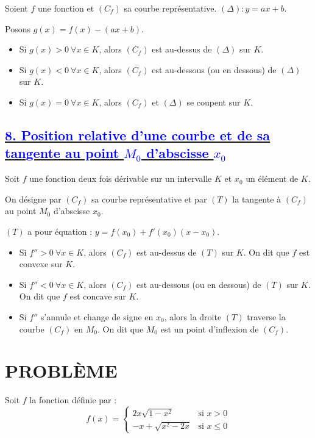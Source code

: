 \documentclass{article}
\begin{document}
Soient $f$ une fonction et $(C_f)$ sa courbe représentative. $(\Delta) : y = ax + b$.

Posons $g(x) = f(x) - (ax + b)$.

\begin{itemize}
    \item Si $g(x) > 0 \ \forall x \in K$, alors $(C_f)$ est au-dessus de $(\Delta)$ sur $K$.
    \item Si $g(x) < 0 \ \forall x \in K$, alors $(C_f)$ est au-dessous (ou en dessous) de $(\Delta)$ sur $K$.
    \item Si $g(x) = 0 \ \forall x \in K$, alors $(C_f)$ et $(\Delta)$ se coupent sur $K$.
\end{itemize}
\subsection*{\underline{\textbf{\textcolor{blue}{8. Position relative d’une courbe et de sa tangente au point \( M_{0} \)  d'abscisse \( x_{0} \)}}}}

Soit $f$ une fonction deux fois dérivable sur un intervalle $K$ et $x_0$ un élément de $K$. 

On désigne par $(C_f)$ sa courbe représentative et par $(T)$ la tangente à $(C_f)$ au point $M_0$ d’abscisse $x_0$.

$(T)$ a pour équation : $y = f(x_0) + f'(x_0)(x - x_0)$.

\begin{itemize}
    \item Si $f'' > 0 \ \forall x \in K$, alors $(C_f)$ est au-dessus de $(T)$ sur $K$. On dit que $f$ est convexe sur $K$.
    \item Si $f'' < 0 \ \forall x \in K$, alors $(C_f)$ est au-dessous (ou en dessous) de $(T)$ sur $K$. On dit que $f$ est concave sur $K$.
    \item Si $f''$ s'annule et change de signe en $x_0$, alors la droite $(T)$ traverse la courbe $(C_f)$ en $M_0$. On dit que $M_0$ est un point d’inflexion de $(C_f)$.
\end{itemize}
\section*{PROBLÈME}

Soit $f$ la fonction définie par :
\[
f(x) =
\begin{cases} 
2x\sqrt{1 - x^2} & \text{si } x > 0 \\ 
-x + \sqrt{x^2 - 2x} & \text{si } x \leq 0 
\end{cases}
\]
\end{document}
